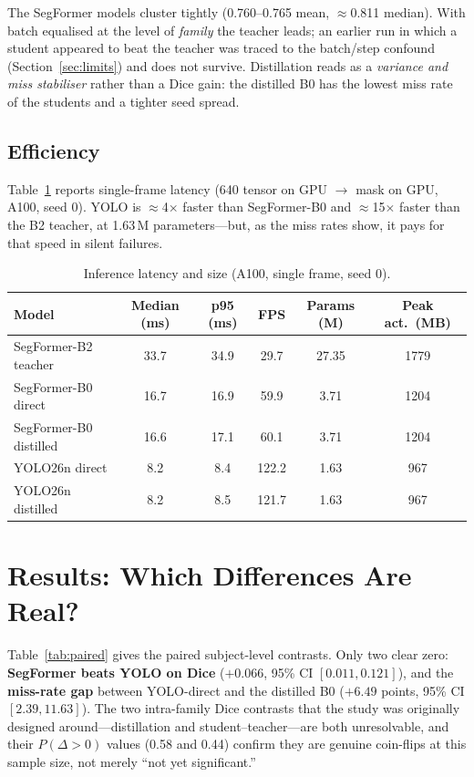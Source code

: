\documentclass[11pt]{article}
\begin{document}
The SegFormer models cluster tightly (0.760--0.765 mean, $\approx$0.811 median).
With batch equalised at the level of \emph{family} the teacher leads; an earlier
run in which a student appeared to beat the teacher was traced to the batch/step
confound (Section~\ref{sec:limits}) and does not survive. Distillation reads as a
\emph{variance and miss stabiliser} rather than a Dice gain: the distilled B0 has
the lowest miss rate of the students and a tighter seed spread.

\subsection{Efficiency}
Table~\ref{tab:speed} reports single-frame latency (640 tensor on GPU $\rightarrow$
mask on GPU, A100, seed 0). YOLO is $\approx$4$\times$ faster than SegFormer-B0
and $\approx$15$\times$ faster than the B2 teacher, at 1.63\,M parameters---but,
as the miss rates show, it pays for that speed in silent failures.

\begin{table}[h]
\centering
\caption{Inference latency and size (A100, single frame, seed 0).}
\label{tab:speed}
\begin{tabular}{lccccc}
\toprule
Model & Median (ms) & p95 (ms) & FPS & Params (M) & Peak act.\ (MB) \\
\midrule
SegFormer-B2 teacher   & 33.7 & 34.9 & 29.7 & 27.35 & 1779 \\
SegFormer-B0 direct    & 16.7 & 16.9 & 59.9 & 3.71  & 1204 \\
SegFormer-B0 distilled & 16.6 & 17.1 & 60.1 & 3.71  & 1204 \\
YOLO26n direct         & 8.2  & 8.4  & 122.2 & 1.63 & 967 \\
YOLO26n distilled      & 8.2  & 8.5  & 121.7 & 1.63 & 967 \\
\bottomrule
\end{tabular}
\end{table}

\section{Results: Which Differences Are Real?}
Table~\ref{tab:paired} gives the paired subject-level contrasts. Only two clear
zero: \textbf{SegFormer beats YOLO on Dice} ($+0.066$, 95\% CI $[0.011, 0.121]$),
and the \textbf{miss-rate gap} between YOLO-direct and the distilled B0
($+6.49$ points, 95\% CI $[2.39, 11.63]$). The two intra-family Dice contrasts
that the study was originally designed around---distillation and
student--teacher---are both unresolvable, and their $P(\Delta{>}0)$ values
(0.58 and 0.44) confirm they are genuine coin-flips at this sample size, not
merely ``not yet significant.''
\end{document}
